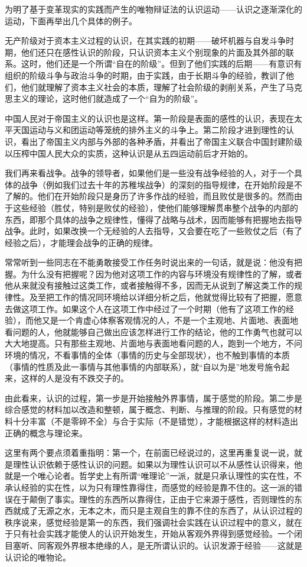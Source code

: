 \documentclass[UTF8, 12pt, a4paper]{ctexrep}
\begin{document}
为明了基于变革现实的实践而产生的唯物辩证法的认识运动——认识之逐渐深化的运动，下面再举出几个具体的例子。

无产阶级对于资本主义过程的认识，在其实践的初期——破坏机器与自发斗争时期，他们还只在感性认识的阶段，只认识资本主义个别现象的片面及其外部的联系。这时，他们还是一个所谓“自在的阶级”。但到了他们实践的后期——有意识有组织的阶级斗争与政治斗争的时期，由于实践，由于长期斗争的经验，教训了他们，他们就理解了资本主义社会的本质，理解了社会阶级的剥削关系，产生了马克思主义的理论，这时他们就造成了一个“自为的阶级”。

中国人民对于帝国主义的认识也是这样。第一阶段是表面的感性的认识，表现在太平天国运动与义和团运动等笼统的排外主义的斗争上。第二阶段才进到理性的认识，看出了帝国主义内部与外部的各种矛盾，并看出了帝国主义联合中国封建阶级以压榨中国人民大众的实质，这种认识是从五四运动前后才开始的。

我们再来看战争。战争的领导者，如果他们是一些没有战争经验的人，对于一个具体的战争（例如我们过去十年的苏稚埃战争）的深刻的指导规律，在开始阶段是不了解的。他们在开始阶段只是身历了许多作战的经验，而且败仗是很多的。然而由于这些经验（胜仗，特别是败仗的经验），使他们能够理解贯串整个战争的内部的东西，即那个具体的战争之规律性，懂得了战略与战术，因而能够有把握地去指导战争。此时，如果改换一个无经验的人去指导，又会要在吃了一些败仗之后（有了经验之后），才能理会战争的正确的规律。

常常听到一些同志在不能勇敢接受工作任务时说出来的一句话，就是说：他没有把握。为什么没有把握呢？因为他对这项工作的内容与环境没有规律性的了解，或者他从来就没有接触过这类工作，或者接触得不多，因而无从说到了解这类工作的规律性。及至把工作的情况同环境给以详细分析之后，他就觉得比较有了把握，愿意去做这项工作。如果这个人在这项工作中经过了一个时期（他有了这项工作的经验），而他又是一个肯虚心体察客观情况的人，不是一个主观地、片面地、表面地看问题的人，他就能够自己做出应该怎样进行工作的结论，他的工作勇气也就可以大大地提高。只有那些主观地、片面地与表面地看问题的人，跑到一个地方，不问环境的情况，不看事情的全体（事情的历史与全部现状），也不触到事情的本质（事情的性质及此一事情与其他事情的内部联系），就“自以为是”地发号施令起来，这样的人是没有不跌交子的。

由此看来，认识的过程，第一步是开始接触外界事情，属于感觉的阶段。第二步是综合感觉的材料加以改造和整顿，属于概念、判断、与推理的阶段。只有感觉的材料十分丰富（不是零碎不全）与合于实际（不是错觉），才能根据这样的材料造出正确的概念与理论来。

这里有两个要点须着重指明：第一个，在前面已经说过的，这里再重复说一说，就是理性认识依赖于感性认识的问题。如果以为理性认识可以不从感性认识得来，他就是一个唯心论者。哲学史上有所谓“唯理论”一派，就是只承认理性的实在性，不承认经验的实在性，以为只有理性靠得住，而感觉的经验是靠不住的。这一派的错误在于颠倒了事实。理性的东西所以靠得住，正由于它来源于感性，否则理性的东西就成了无源之水，无本之木，而只是主观自生的靠不住的东西了，从认识过程的秩序说来，感觉经验是第一的东西，我们强调社会实践在认识过程中的意义，就在于只有社会实践才能使人的认识开始发生，开始从客观外界得到感觉经验。一个闭目塞听、同客观外界根本绝缘的人，是无所谓认识的。认识发源于经验——这就是认识论的唯物论。
\end{document}
